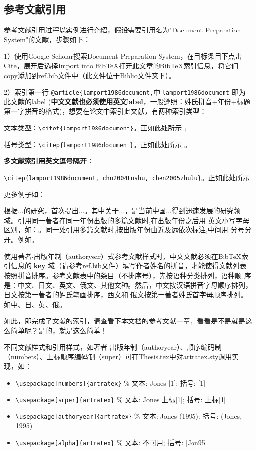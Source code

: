 \subsection{参考文献引用}

参考文献引用过程以实例进行介绍，假设需要引用名为"Document Preparation System"的文献，步骤如下：

1）使用Google Scholar搜索Document Preparation System，在目标条目下点击Cite，展开后选择Import into BibTeX打开此文章的BibTeX索引信息，将它们copy添加到ref.bib文件中（此文件位于Biblio文件夹下）。

2）索引第一行 \verb|@article{lamport1986document,|中 \verb|lamport1986document| 即为此文献的label (\textbf{中文文献也必须使用英文label}，一般遵照：姓氏拼音+年份+标题第一字拼音的格式)，想要在论文中索引此文献，有两种索引类型：

文本类型：\verb|\citet{lamport1986document}|。正如此处所示 \citet{lamport1986document}; 

括号类型：\verb|\citep{lamport1986document}|。正如此处所示 \citep{lamport1986document}。

\textbf{多文献索引用英文逗号隔开}：

\verb|\citep{lamport1986document, chu2004tushu, chen2005zhulu}|。正如此处所示 \citep{lamport1986document, chu2004tushu, chen2005zhulu}

更多例子如：

\citet{walls2013drought}根据...的研究，首次提出...。其中关于...\citep{walls2013drought}，是当前中国...得到迅速发展的研究领域\citep{chen1980zhongguo}。引用同一著者在同一年份出版的多篇文献时,在出版年份之后用
英文小写字母区别，如：\citep{yuan2012lana, yuan2012lanb, yuan2012lanc}。同一处引用多篇文献时,按出版年份由近及远依次标注,中间用
分号分开。例如\citep{chen1980zhongguo, stamerjohanns2009mathml, hls2012jinji, niu2013zonghe}。

使用著者-出版年制（authoryear）式参考文献样式时，中文文献必须在BibTeX索引信息的 \textbf{key} 域（请参考ref.bib文件）填写作者姓名的拼音，才能使得文献列表按照拼音排序。参考文献表中的条目（不排序号），先按语种分类排列，语种顺 序是：中文、日文、英文、俄文、其他文种。然后，中文按汉语拼音字母顺序排列，日文按第一著者的姓氏笔画排序，西文和 俄文按第一著者姓氏首字母顺序排列。如中\citep{niu2013zonghe}、日\citep{Bohan1928}、英\citep{stamerjohanns2009mathml}、俄\citep{Dubrovin1906}。

如此，即完成了文献的索引，请查看下本文档的参考文献一章，看看是不是就是这么简单呢？是的，就是这么简单！

不同文献样式和引用样式，如著者-出版年制（authoryear）、顺序编码制（numbers）、上标顺序编码制（super）可在Thesis.tex中对artratex.sty调用实现，如：
\begin{itemize}
    \footnotesize
    \item \verb+\usepackage[numbers]{artratex}+ $\%$ 文本: Jones [1]; 括号: [1]
    \item \verb+\usepackage[super]{artratex}+ $\%$ 文本: Jones 上标[1]; 括号: 上标[1]
    \item \verb+\usepackage[authoryear]{artratex}+ $\%$ 文本: Jones (1995); 括号: (Jones, 1995)
    \item \verb+\usepackage[alpha]{artratex}+ $\%$ 文本: 不可用; 括号: [Jon95]
\end{itemize}


